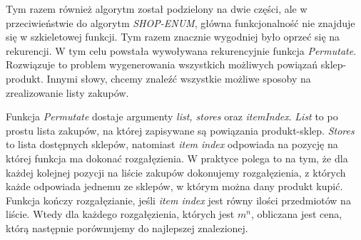 \documentclass[a4paper]{article}
\begin{document}
Tym razem również algorytm został podzielony na dwie części, ale w przeciwieństwie do algorytm \textit{SHOP-ENUM}, główna funkcjonalność nie znajduje się w szkieletowej funkcji. Tym razem znacznie wygodniej było oprzeć się na rekurencji. W tym celu powstała wywoływana rekurencyjnie funkcja \textit{Permutate}. Rozwiązuje to problem wygenerowania wszystkich możliwych powiązań sklep-produkt. Innymi słowy, chcemy znaleźć wszystkie możliwe sposoby na zrealizowanie listy zakupów.

Funkcja \textit{Permutate} dostaje argumenty \textit{list, stores} oraz \textit{itemIndex}. \textit{List} to po prostu lista zakupów, na której zapisywane są powiązania produkt-sklep. \textit{Stores} to lista dostępnych sklepów, natomiast \textit{item index} odpowiada na pozycję na której funkcja ma dokonać rozgałęzienia. W praktyce polega to na tym, że dla każdej kolejnej pozycji na liście zakupów dokonujemy rozgałęzienia, z których każde odpowiada jednemu ze sklepów, w którym można dany produkt kupić. Funkcja kończy rozgałęzianie, jeśli \textit{item index} jest równy ilości przedmiotów na liście. Wtedy dla każdego rozgałęzienia, których jest $m^n$, obliczana jest cena, którą następnie porównujemy do najlepszej znalezionej.
\newpage
\end{document}

